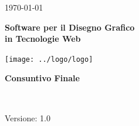 \usepackage{multirow}
\title{\TITOLODOC}
\author{Dal Bosco Davide}



\renewcommand{\insertversion}{1.0} %
\renewcommand{\TITOLODOC}{Consuntivo Finale} %
\renewcommand{\glosspath}{.\glossario} %

\begin{titlepage}
\begin{center}
	\begin{Large}	\today \end{Large}
\end{center}

\vspace{20pt}

\begin{center}
	\begin{Huge}
				\textbf{\ajax}
	\end{Huge}
\end{center}			

\begin{center}
	\begin{large}
				\textbf{Software per il Disegno Grafico\\ in Tecnologie Web}
	\end{large}
\end{center}			

\vspace{20pt}

\begin{center}
\texttt{[image: ../logo/logo]}
\end{center}

\vspace{170pt}
\begin{center} %
	\begin{Huge}
				\textbf{\TITOLODOC}
	\end{Huge}
			\\
\end{center}
\vspace{190pt}
\begin{center}
Versione: \insertversion
\end{center}
\end{titlepage}

\newpage

